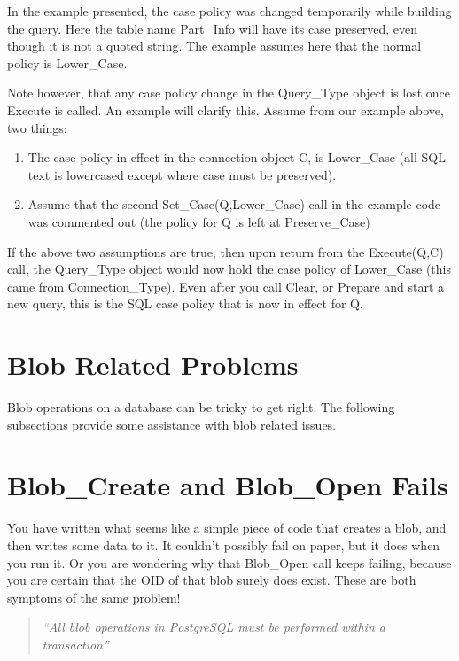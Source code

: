 \documentclass[english,letterpaper]{book}
\begin{document}
In the example presented, the case policy was changed temporarily
while building the query. Here the table name Part\_Info will have
its case preserved, even though it is not a quoted string. The example
assumes here that the normal policy is Lower\_Case. 

Note however, that any case policy change in the Query\_Type object
is lost once Execute is called. An example will clarify this. Assume
from our example above, two things:

\begin{enumerate}
   \item The case policy in effect in the connection object C, is Lower\_Case
         (all SQL text is lowercased except where case must be preserved).
   \item Assume that the second Set\_Case(Q,Lower\_Case) call in the example
         code was commented out (the policy for Q is left at Preserve\_Case)
\end{enumerate}

If the above two assumptions are true, then upon return from the Execute(Q,C)
call, the Query\_Type object would now hold the case policy of Lower\_Case
(this came from Connection\_Type). Even after you call Clear, or Prepare
and start a new query, this is the SQL case policy that is now in
effect for Q.


\section{Blob Related Problems}

Blob operations on a database can be tricky to get right. The following
subsections provide some assistance with blob related issues.


\section{Blob\_Create and Blob\_Open Fails}

You have written what seems like a simple piece of code that creates
a blob, and then writes some data to it. It couldn't possibly fail
on paper, but it does when you run it. Or you are wondering why that
Blob\_Open call keeps failing, because you are certain that the OID
of that blob surely does exist. These are both symptoms of the same
problem!

\begin{quote}
   \emph{``All blob operations in PostgreSQL must be performed within
      a transaction''}
\end{quote}
\end{document}
